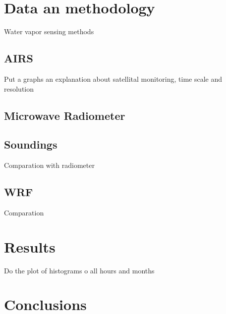 \documentclass{ametsoc}
\begin{document}
\section*{Data an methodology}
Water vapor sensing methods
\subsection*{AIRS}
Put a graphs an explanation about satellital monitoring, time scale and resolution
\subsection*{Microwave Radiometer}

\subsection*{Soundings}
Comparation with radiometer
\subsection*{WRF}
Comparation

\section*{Results}
Do the plot of histograms o all hours and months

\section*{Conclusions}


%


\end{document}
